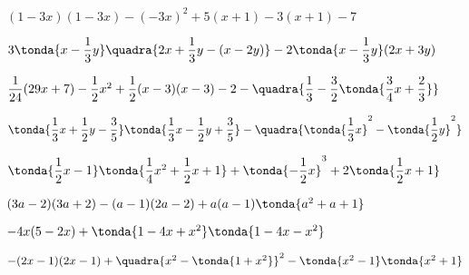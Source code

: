 \begin{esercizio}
\begin{enumeratea}
\item \((1-3x)(1-3x)-(-3x)^{2}+5(x+1)-3(x+1)-7\) 
\item \(3\tonda{x-\dfrac{1}{3}y}\quadra{2x+\dfrac{1}{3}y-(x-2y)} - 
2\tonda{x-\dfrac{1}{3}y}(2x+3y)\) %
\item \(\dfrac{1}{24}(29x+7)-\dfrac{1}{2}x^{2}+\dfrac{1}{2}(x-3)(x-3)-2 - 
\quadra{\dfrac{1}{3}-\dfrac{3}{2}\tonda{\dfrac{3}{4}x+\dfrac{2}{3}}}\) 
\item \(\tonda{\dfrac{1}{3}x+\dfrac{1}{2}y-
\dfrac{3}{5}}\tonda{\dfrac{1}{3}x- 
\dfrac{1}{2}y+\dfrac{3}{5}}-\quadra{\tonda{\dfrac{1}{3}x}^{2}- 
\tonda{\dfrac{1}{2}y}^{2}}\) 
\item \(\tonda{\dfrac{1}{2}x-1}\tonda{\dfrac{1}{4}x^{2}+\dfrac{1}{2}x+1} + 
\tonda{ -{\dfrac{1}{2}}x}^{3}+2\tonda{\dfrac{1}{2}x+1}\) 
\item \((3a-2)(3a+2)-(a-1)(2a-2)+a(a-1)\tonda{a^{2}+a+1}\) 
\item \(-4x(5-2x)+\tonda{1-4x+x^{2}}\tonda{1-4x-x^{2}}\) 
\item \(-(2x-1)(2x-1)+\quadra{x^{2}-\tonda{1+x^{2}}}^{2}-\tonda{x^{2} 
-1}\tonda{x^{2}+1}\) 
\\

\end{enumeratea}
\end{esercizio}
